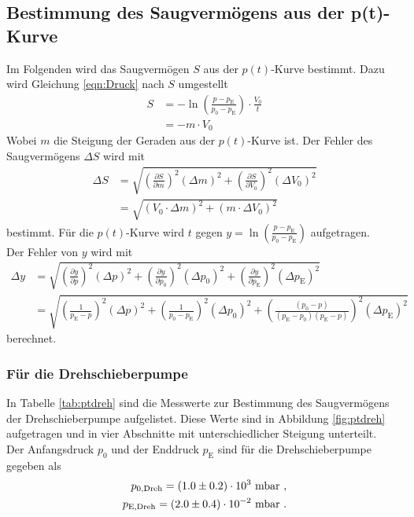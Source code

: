 \subsection{Bestimmung des Saugvermögens aus der p(t)-Kurve}
Im Folgenden wird das Saugvermögen $S$ aus der $p(t)$-Kurve bestimmt. Dazu wird Gleichung \eqref{eqn:Druck} nach $S$ umgestellt
\begin{align}
  S &= -\ln\left(\frac{p - p_\text{E}}{p_0 - p_\text{E}} \right) \cdot \frac{V_0}{t} \\
  &= -m\cdot V_0
\end{align}
Wobei $m$ die Steigung der Geraden aus der $p(t)$-Kurve ist. Der Fehler des Saugvermögens $\Delta S$ wird mit
\begin{align}
  \Delta S &= \sqrt{ \left( \frac{\partial S}{\partial m} \right)^2 (\Delta m)^2 + \left( \frac{\partial S}{\partial V_0} \right)^2 (\Delta V_0)^2 } \nonumber \\
  &= \sqrt{ (V_0 \cdot \Delta m)^2 + (m \cdot \Delta V_0)^2 }
\end{align}
bestimmt. Für die $p(t)$-Kurve wird $t$ gegen $y = \ln\left(\frac{p - p_\text{E}}{p_0 - p_\text{E}} \right)$ aufgetragen. \\
Der Fehler von $y$ wird mit
\begin{align}
  \Delta y &= \sqrt{ \left(\frac{\partial y}{\partial p} \right)^2 (\Delta p)^2 + \left(\frac{\partial y}{\partial p_0} \right)^2 (\Delta p_0)^2 + \left(\frac{\partial y}{\partial p_\text{E}} \right)^2 (\Delta p_\text{E})^2 } \nonumber \\
  &= \sqrt{ \left(\frac{1}{p_\text{E}-p} \right)^2 (\Delta p)^2 + \left(\frac{1}{p_0-p_\text{E}} \right)^2 (\Delta p_0)^2 + \left(\frac{(p_0-p)}{(p_\text{E}-p_0)(p_\text{E}-p)} \right)^2 (\Delta p_\text{E})^2 }
\end{align}
berechnet.



\subsubsection{Für die Drehschieberpumpe}
In Tabelle \eqref{tab:ptdreh} sind die Messwerte zur Bestimmung des Saugvermögens der Drehschieberpumpe aufgelistet. Diese Werte sind in Abbildung \eqref{fig:ptdreh} aufgetragen und in vier Abschnitte mit unterschiedlicher Steigung unterteilt. \\
Der Anfangsdruck $p_0$ und der Enddruck $p_\text{E}$ sind für die Drehschieberpumpe gegeben als
\begin{align*}
  p_{0,\text{Dreh}} = (\num{1 +- 0.2})\cdot 10^3\ \text{mbar} \ , \\
  p_{\text{E},\text{Dreh}} = (\num{2 +- 0.4})\cdot 10^{-2}\ \text{mbar} \ .
\end{align*}

